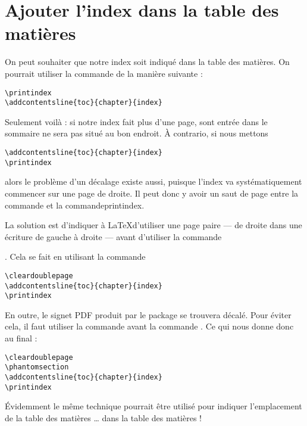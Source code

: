 

\section{Ajouter l'index dans la table des matières}

On peut souhaiter que notre index soit indiqué dans la table des matières. On pourrait utiliser la commande  de la manière suivante :

\begin{verbatim}
\printindex
\addcontentsline{toc}{chapter}{index}
\end{verbatim}

Seulement voilà : si notre index fait plus d'une page, sont entrée dans le sommaire ne sera pas situé au bon endroit. À contrario, si nous mettons

\begin{verbatim}
\addcontentsline{toc}{chapter}{index}
\printindex
\end{verbatim}

alors le problème d'un décalage existe aussi, puisque l'index va systématiquement commencer sur une page de droite. Il peut donc y avoir un saut de page entre la commande  et la commande{printindex}. 

La solution est d'indiquer à \LaTeX d'utiliser une page paire --- de droite dans une écriture de gauche à droite ---  avant d'utiliser la commande \addcontentsline. Cela se fait en utilisant la commande 

\begin{verbatim}
\cleardoublepage
\addcontentsline{toc}{chapter}{index}
\printindex
\end{verbatim}

En outre, le signet PDF produit par le package  se trouvera décalé. Pour éviter cela, il faut utiliser la commande  avant la commande . Ce qui nous donne donc au final :

\begin{verbatim}
\cleardoublepage
\phantomsection
\addcontentsline{toc}{chapter}{index}
\printindex
\end{verbatim}

\begin{anedocte}
Évidemment le même technique pourrait être utilisé pour indiquer l'emplacement de la table des matières … dans la table des matières !
\end{anedocte}